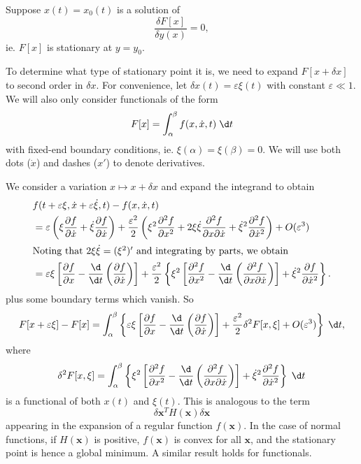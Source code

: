 \documentclass[a4paper]{article}
\begin{document}
Suppose $x(t) = x_0(t)$ is a solution of
\[
  \frac{\delta F[x]}{\delta y(x)} = 0,
\]
ie. $F[x]$ is stationary at $y = y_0$.

To determine what type of stationary point it is, we need to expand $F[x + \delta x]$ to second order in $\delta x$. For convenience, let $\delta x(t) = \varepsilon \xi(t)$ with constant $\varepsilon \ll 1$. We will also only consider functionals of the form
\[
  F[x] = \int_\alpha^\beta f(x, \dot{x}, t)\;\d t
\]
with fixed-end boundary conditions, ie. $\xi(\alpha) = \xi(\beta) = 0$. We will use both dots ($\dot{x}$) and dashes ($x'$) to denote derivatives.

We consider a variation $x \mapsto x + \delta x$ and expand the integrand to obtain
\begin{align*}
  &f(t + \varepsilon \xi, \dot{x} + \varepsilon \dot{\xi}, t) - f(x, \dot{x}, t)\\
  &= \varepsilon \left(\xi \frac{\partial f}{\partial \dot{x}} + \dot{\xi}\frac{\partial f}{\partial \dot{x}}\right) + \frac{\varepsilon^2}{2}\left(\xi^2 \frac{\partial^2 f}{\partial x^2} + 2\xi\dot{\xi} \frac{\partial^2 f}{\partial x \partial \dot{x}} + \dot{\xi}^2 \frac{\partial^2 f}{\partial \dot{x}^2}\right) + O(\varepsilon^3)\\
  \intertext{Noting that $2\xi \dot{\xi} = (\xi^2)'$ and integrating by parts, we obtain}
  &= \varepsilon \xi\left[\frac{\partial f}{\partial x} - \frac{\d}{\d t}\left(\frac{\partial f}{\partial \dot{x}}\right)\right] + \frac{\varepsilon^2}{2}\left\{\xi^2\left[\frac{\partial^2 f}{\partial x^2} - \frac{\d}{\d t}\left(\frac{\partial^2 f}{\partial x\partial \dot{x}}\right)\right] + \dot{\xi}^2 \frac{\partial f}{\partial \dot{x}^2}\right\}.
\end{align*}
plus some boundary terms which vanish. So
\[
  F[x + \varepsilon \xi] - F[x] = \int_\alpha^\beta\left\{\varepsilon\xi\left[\frac{\partial f}{\partial x} - \frac{\d}{\d t}\left(\frac{\partial f}{\partial \dot{x}}\right)\right] + \frac{\varepsilon^2}{2}\delta^2 F[x, \xi] + O(\varepsilon^3)\right\}\;\d t,
\]
where
\[
  \delta^2 F[x, \xi] = \int_\alpha^\beta \left\{\xi^2 \left[\frac{\partial^2 f}{\partial x^2} - \frac{\d}{\d t}\left(\frac{\partial^2 f}{\partial x \partial \dot{x}}\right)\right] + \dot{\xi}^2 \frac{\partial^2 f}{\partial \dot{x}^2}\right\}\;\d t
\]
is a functional of both $x(t)$ and $\xi(t)$. This is analogous to the term
\[
  \delta \mathbf{x}^T H(\mathbf{x})\delta \mathbf{x}
\]
appearing in the expansion of a regular function $f(\mathbf{x})$. In the case of normal functions, if $H(\mathbf{x})$ is positive, $f(\mathbf{x})$ is convex for all $\mathbf{x}$, and the stationary point is hence a global minimum. A similar result holds for functionals.
\end{document}
